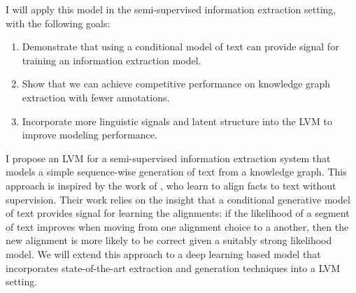 \documentclass[12pt]{article}
\begin{document}

I will apply this model in the
semi-supervised information extraction setting,
with the following goals:
\begin{enumerate}
\item Demonstrate that using a conditional model of text can provide signal for training an information extraction model.
\item Show that we can achieve competitive performance on knowledge graph extraction with fewer annotations. 
\item Incorporate more linguistic signals and latent structure into the LVM to improve modeling performance.
\end{enumerate}

I propose an LVM for a semi-supervised information extraction system that models a simple sequence-wise generation of text from a knowledge graph. This approach is inspired by the work of \citet{liang2009semalign}, who
learn to align facts to text without supervision.
Their work relies on the insight that a conditional generative model of text
provides signal for learning the alignments:
if the likelihood of a segment of text improves when moving from one alignment choice to a another,
then the new alignment is more likely to be correct given a suitably strong likelihood model. We will extend this approach to a deep learning based model that incorporates state-of-the-art extraction and generation techniques into a LVM setting.  
\end{document}
